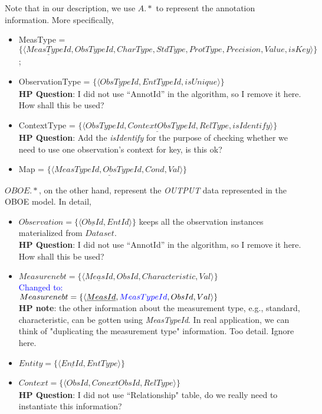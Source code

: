 \documentclass[10pt]{article}
\begin{document}
Note that in our description, we use
$A.*$ to represent the annotation information.
More specifically,
\begin{itemize}
\item MeasType = $\{\langle \underline{MeasTypeId}, ObsTypeId, CharType, StdType, ProtType, Precision, Value, isKey \rangle\}$;
\item ObservationType = $\{\langle \underline{ObsTypeId}, EntTypeId, isUnique \rangle\}$ \\
	{\bf HP Question}: I did not use ``AnnotId'' in the algorithm, so I remove it here. How shall this be used?
\item ContextType = $\{\langle \underline{ObsTypeId, ContextObsTypeId, RelType}, isIdentify\rangle\}$\\
	{\bf HP Question}: Add the {\em isIdentify} for the purpose of checking whether we need to use one observation's context for key, is this ok?
\item Map = $\{\langle \underline{MeasTypeId, ObsTypeId, Cond}, Val\rangle\}$
\end{itemize}

$OBOE.*$, on the other hand, represent the {\em OUTPUT} data represented in the OBOE model. In detail,
\begin{itemize}
\item $Observation=\{\langle \underline{ObsId}, EntId \rangle\}$ keeps all the observation instances materialized from $Dataset$.\\
	{\bf HP Question}: I did not use ``AnnotId'' in the algorithm, so I remove it here. How shall this be used?
\item $Measurenebt=\{\langle \underline{MeasId}, ObsId, Characteristic, Val\rangle\}$\\     
         \textcolor{blue}{Changed to: }\\
	$Measurenebt=\{\langle \underline{MeasId}, \textcolor{blue}{MeasTypeId}, ObsId, Val\rangle\}$\\   
          {\bf HP note}: the other information about the measurement type, e.g., standard, characteristic, can be gotten using {\em MeasTypeId}.
         In  real application, we can think of "duplicating the measurement type" information. Too detail. Ignore here. 
\item $Entity=\{\langle \underline{EntId}, EntType\rangle\}$
\item $Context =\{\langle \underline{ObsId, ConextObsId, RelType}\rangle\}$\\
	{\bf HP Question}: I did not use ``Relationship" table, do we really need to instantiate this information?
\end{itemize}
\end{document}
